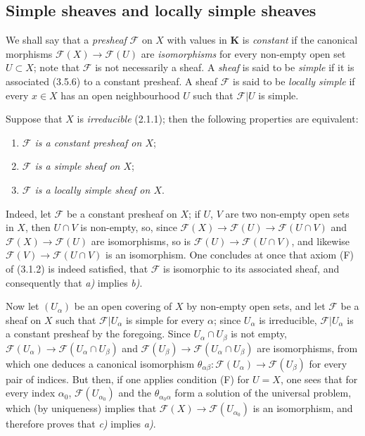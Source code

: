 \subsection{Simple sheaves and locally simple sheaves}

\begin{env}[3.6.1]
\label{0.3.6.1}
We shall say that a \emph{presheaf} $\mathcal{F}$ on $X$ with values in
$\boldsymbol{K}$ is \emph{constant} if the canonical morphisms
$\mathcal{F}(X)\to\mathcal{F}(U)$ are \emph{isomorphisms} for every
non-empty open set $U\subset X$; note that $\mathcal{F}$ is not
necessarily a sheaf. A \emph{sheaf} is said to be \emph{simple}
if it is associated (3.5.6) to a constant presheaf. A sheaf
$\mathcal{F}$ is said to be \emph{locally simple} if every $x\in X$ has an
open neighbourhood $U$ such that $\mathcal{F}|U$ is simple.
\end{env}

\begin{env}[3.6.2]
\label{0.3.6.2}
Suppose that $X$ is \emph{irreducible} (2.1.1); then the following
properties are equivalent:
\begin{enumerate}
  \item[a)] \emph{$\mathcal{F}$ is a constant presheaf on $X$};
  \item[b)] \emph{$\mathcal{F}$ is a simple sheaf on $X$};
  \item[c)] \emph{$\mathcal{F}$ is a locally simple sheaf on $X$}.
\end{enumerate}

Indeed, let $\mathcal{F}$ be a constant presheaf on $X$; if $U$, $V$
are two non-empty open sets in $X$, then $U\cap V$ is non-empty, so, since
$\mathcal{F}(X)\to\mathcal{F}(U)\to\mathcal{F}(U\cap V)$ and
$\mathcal{F}(X)\to\mathcal{F}(U)$ are isomorphisms, so is
$\mathcal{F}(U)\to\mathcal{F}(U\cap V)$, and likewise
$\mathcal{F}(V)\to\mathcal{F}(U\cap V)$ is an isomorphism. One concludes
at once that axiom (F) of (3.1.2) is indeed satisfied, that $\mathcal{F}$ is
isomorphic to its associated sheaf, and consequently that \emph{a)} implies \emph{b)}.

Now let $(U_\alpha)$ be an open covering of $X$ by non-empty open sets,
and let $\mathcal{F}$ be a sheaf on $X$ such that
$\mathcal{F}|U_\alpha$ is simple for every $\alpha$; since $U_\alpha$ is
irreducible, $\mathcal{F}|U_\alpha$ is a constant presheaf by
the foregoing. Since $U_\alpha\cap U_\beta$ is not empty,
$\mathcal{F}(U_\alpha)\to\mathcal{F}(U_\alpha\cap U_\beta)$ and
$\mathcal{F}(U_\beta)\to\mathcal{F}(U_\alpha\cap U_\beta)$ are
isomorphisms, from which one deduces a canonical isomorphism
$\theta_{\alpha\beta}:\mathcal{F}(U_\alpha)\to\mathcal{F}(U_\beta)$ for every
pair of indices. But then, if one applies condition (F) for $U=X$, one
sees that for every index $\alpha_0$, $\mathcal{F}(U_{\alpha_0})$ and the
$\theta_{\alpha_0\alpha}$ form a solution of the universal problem, which
(by uniqueness) implies that
$\mathcal{F}(X)\to\mathcal{F}(U_{\alpha_0})$ is an isomorphism, and therefore
proves that \emph{c)} implies \emph{a)}.
\end{env}

